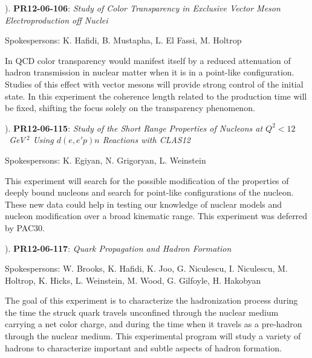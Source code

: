 \vskip 0.3cm

\begin{small}
). {\bf PR12-06-106}: {\it Study of Color Transparency in Exclusive
Vector Meson Electroproduction off Nuclei}

\vskip 0.2cm

\begin{footnotesize}
Spokespersons: K. Hafidi, B. Mustapha, L. El Fassi, M. Holtrop
\end{footnotesize}

\vskip 0.2cm

In QCD color transparency would manifest itself by a reduced attenuation 
of hadron transmission in nuclear matter when it is in a point-like 
configuration.  Studies of this effect with vector mesons will provide
strong control of the initial state.  In this experiment the coherence length 
related to the production time will be fixed, shifting the focus solely on 
the transparency phenomenon.

\vskip 0.3cm

). {\bf PR12-06-115}: {\it Study of the Short Range Properties of
Nucleons at $Q^2 < 12$~GeV\,$^2$ Using $d(e,e'p)n$ Reactions with CLAS12}

\vskip 0.2cm

\begin{footnotesize}
Spokespersons: K. Egiyan, N. Grigoryan, L. Weinstein
\end{footnotesize}

\vskip 0.2cm

This experiment will search for the possible modification of the
properties of deeply bound nucleons and search for point-like
configurations of the nucleon.  These new data could help in
testing our knowledge of nuclear models and nucleon modification
over a broad kinematic range.  This experiment was deferred by
PAC30.

\vskip 0.3cm

). {\bf PR12-06-117}: {\it Quark Propagation and Hadron Formation}

\vskip 0.2cm

\begin{footnotesize}
Spokespersons: W. Brooks, K. Hafidi, K. Joo, G. Niculescu, I. Niculescu,
M. Holtrop, K. Hicks, L. Weinstein, M. Wood, G. Gilfoyle, H. Hakobyan
\end{footnotesize}

\vskip 0.2cm

The goal of this experiment is to characterize the hadronization process 
during the time the struck quark travels unconfined through the nuclear 
medium carrying a net color charge, and during the time when it travels 
as a pre-hadron through the nuclear medium.  This experimental program 
will study a variety of hadrons to characterize important and subtle 
aspects of hadron formation.
\end{small}

